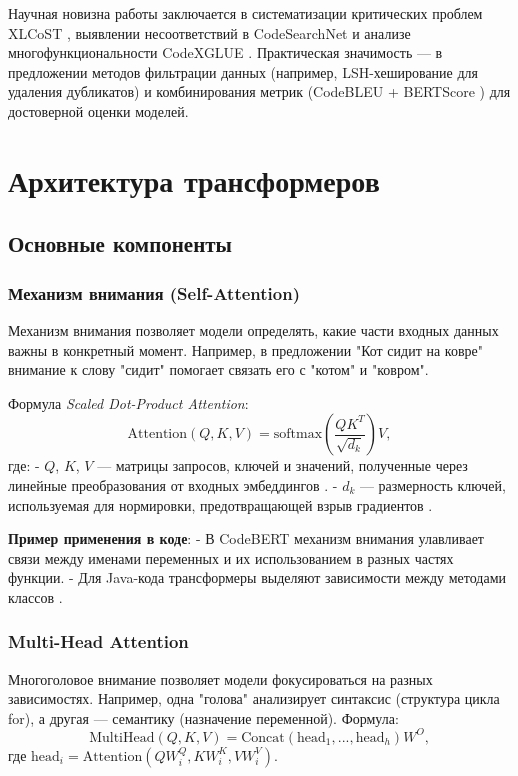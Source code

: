 \documentclass[14pt]{article}
\theoremstyle{definition}
\begin{document}
Научная новизна работы заключается в систематизации критических проблем XLCoST \cite{zhu2022}, выявлении несоответствий в CodeSearchNet \cite{husain2019codesearchnet} и анализе многофункциональности CodeXGLUE \cite{lu2021codexglue}. Практическая значимость — в предложении методов фильтрации данных (например, LSH-хеширование для удаления дубликатов) и комбинирования метрик (CodeBLEU + BERTScore \cite{zhang2020}) для достоверной оценки моделей.



\newpage
\section{Архитектура трансформеров}
\subsection{Основные компоненты}
\subsubsection{Механизм внимания (Self-Attention)}
Механизм внимания позволяет модели определять, какие части входных данных важны в конкретный момент. Например, в предложении "Кот сидит на ковре" внимание к слову "сидит" помогает связать его с "котом" и "ковром".

Формула \textit{Scaled Dot-Product Attention}:
\[
\text{Attention}(Q, K, V) = \text{softmax}\left(\frac{QK^T}{\sqrt{d_k}}\right)V,
\]
где:
- \(Q\), \(K\), \(V\) — матрицы запросов, ключей и значений, полученные через линейные преобразования от входных эмбеддингов \cite{chen2023}.
- \(d_k\) — размерность ключей, используемая для нормировки, предотвращающей взрыв градиентов \cite{chen2023}.

\textbf{Пример применения в коде}: 
- В CodeBERT \cite{feng2020codebert} механизм внимания улавливает связи между именами переменных и их использованием в разных частях функции.
- Для Java-кода трансформеры выделяют зависимости между методами классов \cite{feng2023}.

\subsubsection{Multi-Head Attention}
Многоголовое внимание позволяет модели фокусироваться на разных зависимостях. Например, одна "голова" анализирует синтаксис (структура цикла for), а другая — семантику (назначение переменной). Формула:
\[
\text{MultiHead}(Q, K, V) = \text{Concat}(\text{head}_1, ..., \text{head}_h)W^O,
\]
где \(\text{head}_i = \text{Attention}(QW_i^Q, KW_i^K, VW_i^V)\).
\end{document}
